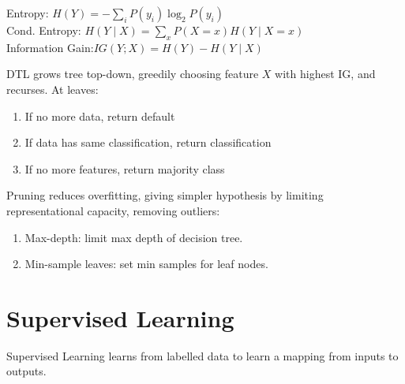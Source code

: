 \documentclass[12pt, a4paper]{article}
\begin{document}
\begin{multicols*}{3}
Entropy: $\displaystyle H(Y)= -\sum_i P(y_i)\log_2P(y_i)$\\
Cond. Entropy: $\displaystyle H(Y\mid X)=\sum_x P(X=x)H(Y\mid X=x)$\\
Information Gain:\;\;$IG(Y;X)=H(Y)-H(Y\mid X)$

DTL grows tree top-down, greedily choosing feature $X$ with highest IG, and recurses. At leaves:
\begin{enumerate}[\roman*.]
  \item If no more data, return default 
  \item If data has same classification, return classification 
  \item If no more features, return majority class
\end{enumerate}

Pruning reduces overfitting, giving simpler hypothesis by limiting representational capacity, removing outliers:
\begin{enumerate}[\roman*.]
  \item Max-depth: limit max depth of decision tree.
  \item Min-sample leaves: set min samples for leaf nodes. 
\end{enumerate}
\vspace{-1em}
\colbreak
\section{Supervised Learning}
Supervised Learning learns from labelled data to learn a mapping from inputs to outputs.


\end{multicols*}
\end{document}
